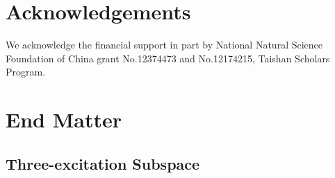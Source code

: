 \documentclass[longbibliography, aps, prx, amsmath, amssymb, amsfonts, twocolumn,superscriptaddress, footinbib]{revtex4-1}
\begin{document}
    \section*{Acknowledgements}
	We acknowledge the financial support in part by National Natural Science Foundation of China grant No.12374473 and No.12174215, Taishan Scholars Program.

	
	

\clearpage

	\section*{End Matter~\label{sec:method}}
	\subsection{Three-excitation Subspace~\label{sec:three_excitation}}

\end{document}
